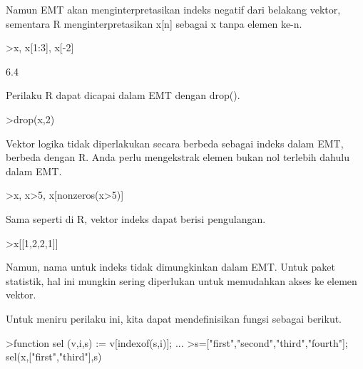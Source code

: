 \documentclass[a4paper,10pt]{article}
\begin{document}
\begin{eulernotebook}
\begin{eulercomment}
Namun EMT akan menginterpretasikan indeks negatif dari belakang
vektor, sementara R menginterpretasikan x[n] sebagai x tanpa elemen
ke-n.
\end{eulercomment}
\begin{eulerprompt}
>x, x[1:3], x[-2]
\end{eulerprompt}
\begin{euleroutput}
  [10.4,  5.6,  3.1,  6.4,  21.7]
  [10.4,  5.6,  3.1]
  6.4
\end{euleroutput}
\begin{eulercomment}
Perilaku R dapat dicapai dalam EMT dengan drop().
\end{eulercomment}
\begin{eulerprompt}
>drop(x,2)
\end{eulerprompt}
\begin{euleroutput}
  [10.4,  3.1,  6.4,  21.7]
\end{euleroutput}
\begin{eulercomment}
Vektor logika tidak diperlakukan secara berbeda sebagai indeks dalam
EMT, berbeda dengan R. Anda perlu mengekstrak elemen bukan nol
terlebih dahulu dalam EMT.
\end{eulercomment}
\begin{eulerprompt}
>x, x>5, x[nonzeros(x>5)]
\end{eulerprompt}
\begin{euleroutput}
  [10.4,  5.6,  3.1,  6.4,  21.7]
  [1,  1,  0,  1,  1]
  [10.4,  5.6,  6.4,  21.7]
\end{euleroutput}
\begin{eulercomment}
Sama seperti di R, vektor indeks dapat berisi pengulangan.
\end{eulercomment}
\begin{eulerprompt}
>x[[1,2,2,1]]
\end{eulerprompt}
\begin{euleroutput}
  [10.4,  5.6,  5.6,  10.4]
\end{euleroutput}
\begin{eulercomment}
Namun, nama untuk indeks tidak dimungkinkan dalam EMT. Untuk paket
statistik, hal ini mungkin sering diperlukan untuk memudahkan akses ke
elemen vektor.

Untuk meniru perilaku ini, kita dapat mendefinisikan fungsi sebagai
berikut.
\end{eulercomment}
\begin{eulerprompt}
>function sel (v,i,s) := v[indexof(s,i)]; ...
>s=["first","second","third","fourth"]; sel(x,["first","third"],s)
\end{eulerprompt}
\begin{euleroutput}
  

\end{euleroutput}
\end{eulernotebook}
\end{document}
